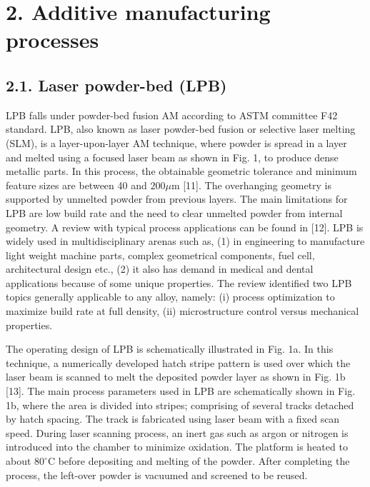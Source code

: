 \documentclass[10pt]{article}
\begin{document}
\section*{2. Additive manufacturing processes}
\subsection*{2.1. Laser powder-bed (LPB)}
LPB falls under powder-bed fusion AM according to ASTM committee F42 standard. LPB, also known as laser powder-bed fusion or selective laser melting (SLM), is a layer-upon-layer AM technique, where powder is spread in a layer and melted using a focused laser beam as shown in Fig. 1, to produce dense metallic parts. In this process, the obtainable geometric tolerance and minimum feature sizes are between 40 and $200 \mu \mathrm{m}$ [11]. The overhanging geometry is supported by unmelted powder from previous layers. The main limitations for LPB are low build rate and the need to clear unmelted powder from internal geometry. A review with typical process applications can be found in [12]. LPB is widely used in multidisciplinary arenas such as, (1) in engineering to manufacture light weight machine parts, complex geometrical components, fuel cell, architectural design etc., (2) it also has demand in medical and dental applications because of some unique properties. The review identified two LPB topics generally applicable to any alloy, namely: (i) process optimization to maximize build rate at full density, (ii) microstructure control versus mechanical properties.

The operating design of LPB is schematically illustrated in Fig. 1a. In this technique, a numerically developed hatch stripe pattern is used over which the laser beam is scanned to melt the deposited powder layer as shown in Fig. 1b [13]. The main process parameters used in LPB are schematically shown in Fig. 1b, where the area is divided into stripes; comprising of several tracks detached by hatch spacing. The track is fabricated using laser beam with a fixed scan speed. During laser scanning process, an inert gas such as argon or nitrogen is introduced into the chamber to minimize oxidation. The platform is heated to about $80^{\circ} \mathrm{C}$ before depositing and melting of the powder. After completing the process, the left-over powder is vacuumed and screened to be reused.
\end{document}
